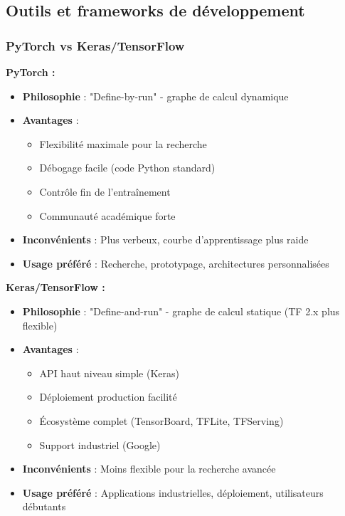 \documentclass[11pt,a4paper,twocolumn]{article}
\begin{document}
\subsection{Outils et frameworks de développement}

\subsubsection{PyTorch vs Keras/TensorFlow}

\textbf{PyTorch :}
\begin{itemize}
    \item \textbf{Philosophie} : "Define-by-run" - graphe de calcul dynamique
    \item \textbf{Avantages} :
        \begin{itemize}
            \item Flexibilité maximale pour la recherche
            \item Débogage facile (code Python standard)
            \item Contrôle fin de l'entraînement
            \item Communauté académique forte
        \end{itemize}
    \item \textbf{Inconvénients} : Plus verbeux, courbe d'apprentissage plus raide
    \item \textbf{Usage préféré} : Recherche, prototypage, architectures personnalisées
\end{itemize}

\textbf{Keras/TensorFlow :}
\begin{itemize}
    \item \textbf{Philosophie} : "Define-and-run" - graphe de calcul statique (TF 2.x plus flexible)
    \item \textbf{Avantages} :
        \begin{itemize}
            \item API haut niveau simple (Keras)
            \item Déploiement production facilité
            \item Écosystème complet (TensorBoard, TFLite, TFServing)
            \item Support industriel (Google)
        \end{itemize}
    \item \textbf{Inconvénients} : Moins flexible pour la recherche avancée
    \item \textbf{Usage préféré} : Applications industrielles, déploiement, utilisateurs débutants
\end{itemize}
\end{document}
